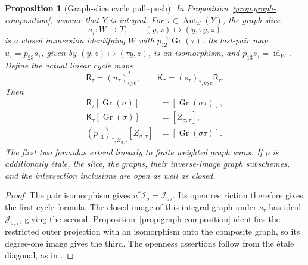 \documentclass[11pt]{article}
\newtheorem{proposition}[theorem]{Proposition}
\theoremstyle{definition}
\theoremstyle{remark}
\begin{document}
\begin{proposition}[Graph-slice cycle pull--push]
\label{prop:graph-cycle-composition}
In Proposition~\ref{prop:graph-composition}, assume that \(Y\) is integral.
For \(\tau\in\operatorname{Aut}_S(Y)\), the graph slice
\[
  s_\tau:W\longrightarrow T,\qquad
  (y,z)\longmapsto(y,\tau y,z)
\]
is a closed immersion identifying \(W\) with
\(p_{12}^{-1}\operatorname{Gr}(\tau)\). Its last-pair map
\(u_\tau=p_{23}s_\tau\), given by \((y,z)\mapsto(\tau y,z)\),
is an isomorphism, and \(p_{13}s_\tau=\operatorname{id}_W\).
Define the actual linear cycle maps
\[
  \mathsf R_\tau=(u_\tau)^*_{\mathrm{cyc}},
  \qquad \mathsf K_\tau=(s_\tau)_{*,\mathrm{cyc}}\mathsf R_\tau.
\]
Then
\[
\begin{aligned}
  \mathsf R_\tau[\operatorname{Gr}(\sigma)]
    &=[\operatorname{Gr}(\sigma\tau)],\\
  \mathsf K_\tau[\operatorname{Gr}(\sigma)]
    &=[Z_{\sigma,\tau}],\\
  (p_{13})_{*,Z_{\sigma,\tau}}[Z_{\sigma,\tau}]
    &=[\operatorname{Gr}(\sigma\tau)].
\end{aligned}
\]
The first two formulas extend linearly to finite weighted graph sums.
If \(p\) is additionally \'{e}tale, the slice, the graphs, their
inverse-image graph subschemes, and the intersection inclusions are open
as well as closed.
\end{proposition}

\begin{proof}
The pair isomorphism gives
\(u_\tau^*\mathcal I_\sigma=\mathcal I_{\sigma\tau}\).
Its open restriction therefore gives the first cycle formula. The closed
image of this integral graph under \(s_\tau\) has ideal
\(\mathcal J_{\sigma,\tau}\), giving the second. Proposition~\ref{prop:graph-composition}
identifies the restricted outer projection with an isomorphism onto the
composite graph, so its degree-one image gives the third. The openness
assertions follow from the \'{e}tale diagonal, as in
\cite{StacksUnramifiedSections}.
\end{proof}
\end{document}
